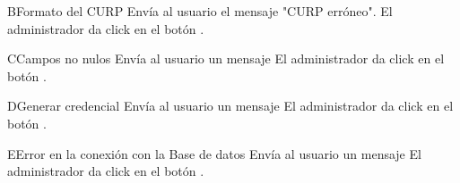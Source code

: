 		\begin{UCtrayectoriaA}{B}{Formato del CURP}
			\UCpaso[\UCsist] Envía al usuario el mensaje "CURP erróneo".
			\UCpaso[\UCsist] El administrador da click en el botón .
		\end{UCtrayectoriaA}
		
		\begin{UCtrayectoriaA}{C}{Campos no nulos}
			\UCpaso[\UCsist] Envía al usuario un mensaje 
			\UCpaso[\UCsist] El administrador da click en el botón .
		\end{UCtrayectoriaA}

		\begin{UCtrayectoriaA}{D}{Generar credencial}
			\UCpaso[\UCsist] Envía al usuario un mensaje 
			\UCpaso[\UCsist] El administrador da click en el botón .
		\end{UCtrayectoriaA}
		
		\begin{UCtrayectoriaA}{E}{Error en la conexión con la Base de datos}
			\UCpaso[\UCsist] Envía al usuario un mensaje 
			\UCpaso[\UCsist] El administrador da click en el botón .
		\end{UCtrayectoriaA}

